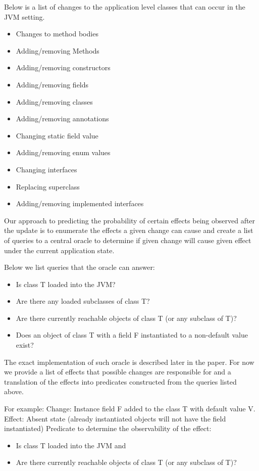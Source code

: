 Below is a list of changes to the application level classes that can occur in the JVM setting.
\begin{itemize}
  \item Changes to method bodies		
  \item Adding/removing Methods		
  \item Adding/removing constructors		
  \item Adding/removing fields		
  \item Adding/removing classes		
  \item Adding/removing annotations		
  \item Changing static field value		
  \item Adding/removing enum values		
  \item Changing interfaces		
  \item Replacing superclass		
  \item Adding/removing implemented interfaces
\end{itemize}

Our approach to predicting the probability of certain effects being observed
after the update is to enumerate the effects a given change can cause and create
a list of queries to a central oracle to determine if given change will cause
given effect under the current application state.

Below we list queries that the oracle can answer:
\begin{itemize}
  \item Is class T loaded into the JVM? 
  \item Are there any loaded subclasses of class T? 
  \item Are there currently reachable objects of class T (or any subclass of T)? 
  \item Does an object of class T with a field F instantiated to a non-default
value exist?
\end{itemize}
 
The exact implementation of such oracle is described later in the paper. For now
we provide a list of effects that possible changes are responsible for and a
translation of the effects into predicates constructed from the queries listed
above.

For example:
Change: Instance field F added to the class T with default value V. 
Effect: Absent state (already instantiated objects will not have the field instantiated)
Predicate to determine the observability of the effect: 
\begin{itemize}
  \item Is class T loaded into the JVM and
  \item Are there currently reachable objects of class T (or any subclass of T)?  
\end{itemize}

